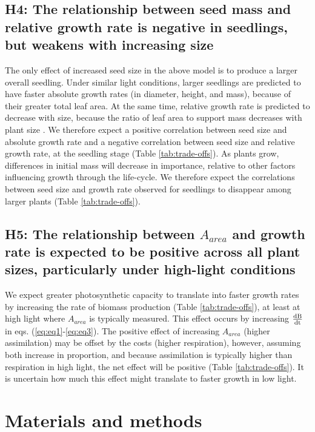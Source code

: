 \documentclass[a4paper,11pt]{article}
\begin{document}
\subsection*{H4: The relationship between seed mass and relative growth rate is negative in seedlings, but weakens with increasing size}

The only effect of increased seed size in the above model is to produce a larger overall seedling. Under similar light conditions, larger seedlings are predicted to have faster absolute growth rates (in diameter, height, and mass), because of their greater total leaf area. At the same time, relative growth rate is predicted to decrease with size, because the ratio of leaf area to support mass decreases with plant size \citep[see also][]{Turnbull:2012ew}. We therefore expect a positive correlation between seed size and absolute growth rate and a negative correlation between seed size and relative growth rate, at the seedling stage (Table \ref{tab:trade-offs}). As plants grow, differences in initial mass will decrease in importance, relative to other factors influencing growth through the life-cycle. We therefore expect the correlations between seed size and growth rate observed for seedlings to disappear among larger plants (Table \ref{tab:trade-offs}).

\subsection*{H5: The relationship between $A_{area}$ and growth rate is expected to be positive across all plant sizes, particularly under high-light conditions}

We expect greater photosynthetic capacity to translate into faster growth rates by increasing the rate of biomass production (Table \ref{tab:trade-offs}), at least at high light where $A_{area}$ is typically measured. This effect occurs by increasing  $\frac{\rm{d} B}{\rm{d} t} $ in eqs. (\ref{eq:eq1}-\ref{eq:eq3}). The positive effect of increasing $A_{area}$ (higher assimilation) may be offset by the costs (higher respiration), however, assuming both increase in proportion, and because assimilation is typically higher than respiration in high light, the net effect will be positive (Table \ref{tab:trade-offs}). It is uncertain how much this effect might translate to faster growth in low light.

\section*{Materials and methods}\label{material-and-methods}
\end{document}
